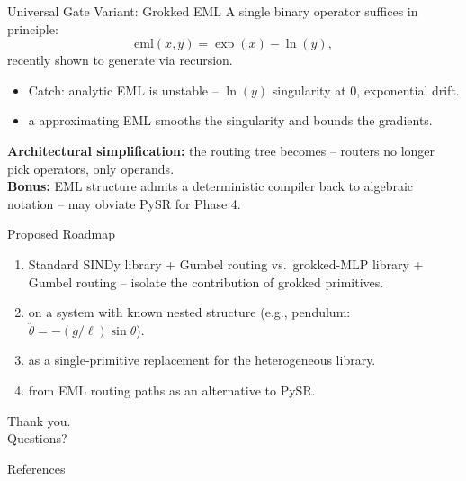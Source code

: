 \documentclass[
11pt,notheorems,hyperref={pdfauthor=Aniruddha Pandey}
]{beamer}
\begin{document}
\begin{frame}{Universal Gate Variant: Grokked EML}
A single binary operator suffices in principle:
\begin{equation*}
    \mathrm{eml}(x, y) = \exp(x) - \ln(y),
\end{equation*}
recently shown to generate  via recursion.
\begin{itemize}
    \item \alert{Catch:} analytic EML is unstable -- $\ln(y)$ singularity at $0$, exponential drift.
    \item {} a  approximating EML smooths the singularity and bounds the gradients.
\end{itemize}
\vspace{0.2cm}
\textbf{Architectural simplification:} the routing tree becomes  -- routers no longer pick operators, only operands.\\[0.2cm]
\textbf{Bonus:} EML structure admits a deterministic compiler back to algebraic notation -- \alert{may obviate PySR for Phase 4}.
\end{frame}

\begin{frame}{Proposed Roadmap}
\begin{enumerate}
    \item {} Standard SINDy library + Gumbel routing vs.\ grokked-MLP library + Gumbel routing -- isolate the contribution of grokked primitives.
    \item {} on a system with known nested structure (e.g., pendulum: $\ddot{\theta} = -(g/\ell)\sin\theta$).
    \item {} as a single-primitive replacement for the heterogeneous library.
    \item {} from EML routing paths as an alternative to PySR.
\end{enumerate}
\end{frame}

{
\begin{frame}[plain]
    \centering
    \vfill
    {\Huge Thank you.}\\[1cm]
    {\Large Questions?}
    \vfill
\end{frame}
}
\addtocounter{framenumber}{-1}

\begin{frame}[allowframebreaks]{References}
    \nocite{*}
    \printbibliography
\end{frame}
\end{document}
